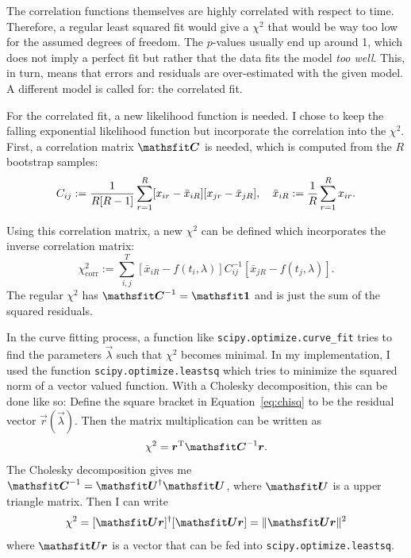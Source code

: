 \documentclass[11pt, english, fleqn, DIV=10, headinclude]{scrartcl}
\begin{document}
The correlation functions themselves are highly correlated with respect to
time. Therefore, a regular least squared fit would give a $\chi^2$ that would
be way too low for the assumed degrees of freedom. The $p$-values usually end
up around 1, which does not imply a perfect fit but rather that the data fits
the model \emph{too well}. This, in turn, means that errors and residuals are
over-estimated with the given model. A different model is called for: the
correlated fit.

For the correlated fit, a new likelihood function is needed. I chose to keep
the falling exponential likelihood function but incorporate the correlation
into the $\chi^2$. First, a correlation matrix $\tens C$ is needed, which is
computed from the $R$ bootstrap samples: \parencite[Section~2]{Michael:1994sz}
\begin{equation}
    \label{eq:correlation_matrix}
    C_{ij} := \frac{1}{R[R-1]} \sum_{r=1}^R
    [x_{ir} - \bar x_{iR}] [x_{jr} - \bar x_{jR}]
    ,\quad
    \bar x_{iR} := \frac 1R \sum_{r=1}^R x_{ir}.
\end{equation}

Using this correlation matrix, a new $\chi^2$ can be defined which incorporates
the inverse correlation matrix:
\begin{equation}
    \label{eq:chisq}
    \chi^2_\text{corr} := \sum_{i, j}^T
    \left[ \bar x_{iR} - f(t_i, \lambda) \right]
    C^{-1}_{ij}
    \left[ \bar x_{jR} - f(t_j, \lambda) \right].
\end{equation}
The regular $\chi^2$ has $\tens C^{-1} = \tens 1$ and is just the sum of the
squared residuals.

In the curve fitting process, a function like
\texttt{scipy.optimize.curve\_fit} tries to find the parameters $\vec\lambda$
such that $\chi^2$ becomes minimal. In my implementation, I used the function
\texttt{scipy.optimize.leastsq} which tries to minimize the squared norm of a
vector valued function. With a Cholesky decomposition, this can be done like
so: Define the square bracket in Equation~\eqref{eq:chisq} to be the residual
vector $\vec r(\vec \lambda)$. Then the matrix multiplication can be written as
\begin{equation}
    \chi^2 = \vec r^\text T \tens C^{-1} \vec r.
\end{equation}
The Cholesky decomposition gives me $\tens C^{-1} = \tens U^\dagger \tens U$,
where $\tens U$ is a upper triangle matrix. Then I can write
\begin{equation}
    \chi^2 = [\tens U \vec r]^\dagger [\tens U \vec r]
    = \| \tens U \vec r \|^2
\end{equation}
where $\tens U \vec r$ is a vector that can be fed into
\texttt{scipy.optimize.leastsq}.
\nocite{SciPy}
\end{document}

